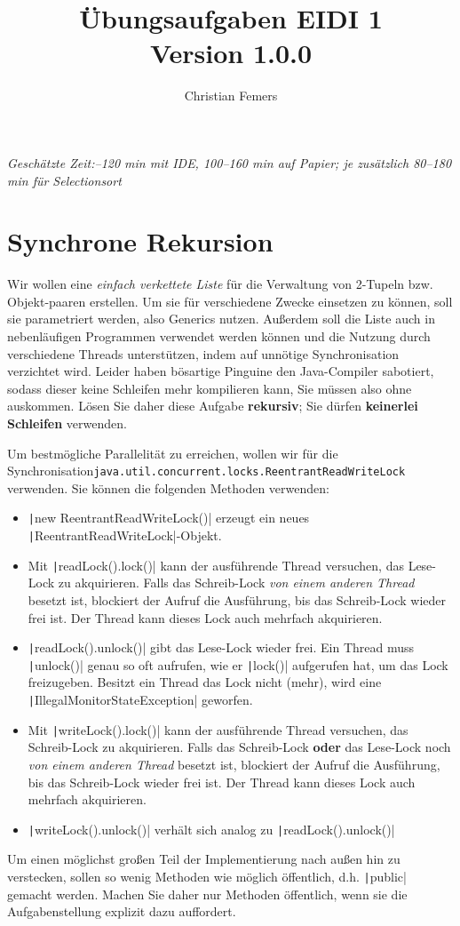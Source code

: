 \documentclass[11pt]{article} %
\title{Übungsaufgaben EIDI 1 \\ \small \color{magenta}Version 1.0.0}
\author{Christian Femers}
\newcommand{\code}[1]{\texttt|#1|}
\begin{document}
\maketitle
\emph{Geschätzte Zeit:–120 min mit IDE, 100–160 min auf Papier; je zusätzlich 80–180 min für Selectionsort}
\section{Synchrone Rekursion}
Wir wollen eine \emph{einfach verkettete Liste} für die Verwaltung von 2-Tupeln bzw. Objekt-paaren erstellen. Um sie für verschiedene Zwecke einsetzen zu können, soll sie parametriert werden, also Generics nutzen. Außerdem soll die Liste auch in nebenläufigen Programmen verwendet werden können und die Nutzung durch verschiedene Threads unterstützen, indem auf unnötige Synchronisation verzichtet wird. Leider haben bösartige Pinguine den Java-Compiler sabotiert, sodass dieser keine Schleifen mehr kompilieren kann, Sie müssen also ohne auskommen. Lösen Sie daher diese Aufgabe \textbf{rekursiv}; Sie dürfen \textbf{keinerlei Schleifen} verwenden.\par
Um bestmögliche Parallelität zu erreichen, wollen wir für die Synchronisation\newline \texttt{java.util.concurrent.locks.ReentrantReadWriteLock} verwenden. Sie können die folgenden Methoden verwenden:
\begin{itemize}
\item \code{new ReentrantReadWriteLock()} erzeugt ein neues \code{ReentrantReadWriteLock}-Objekt.
\item Mit \code{readLock().lock()} kann der ausführende Thread versuchen, das Lese-Lock zu akquirieren. Falls das Schreib-Lock \emph{von einem anderen Thread} besetzt ist, blockiert der Aufruf die Ausführung, bis das Schreib-Lock wieder frei ist. Der Thread kann dieses Lock auch mehrfach akquirieren.
\item \code{readLock().unlock()} gibt das Lese-Lock wieder frei. Ein Thread muss \code{unlock()} genau so oft aufrufen, wie er \code{lock()} aufgerufen hat, um das Lock freizugeben. Besitzt ein Thread das Lock nicht (mehr), wird eine \code{IllegalMonitorStateException} geworfen.
\item Mit \code{writeLock().lock()} kann der ausführende Thread versuchen, das Schreib-Lock zu akquirieren. Falls das Schreib-Lock \textbf{oder} das Lese-Lock noch \emph{von einem anderen Thread} besetzt ist, blockiert der Aufruf die Ausführung, bis das Schreib-Lock wieder frei ist. Der Thread kann dieses Lock auch mehrfach akquirieren.
\item \code{writeLock().unlock()} verhält sich analog zu \code{readLock().unlock()}
\end{itemize}
Um einen möglichst großen Teil der Implementierung nach außen hin zu verstecken, sollen so wenig Methoden wie möglich öffentlich, d.h. \code{public} gemacht werden. Machen Sie daher nur Methoden öffentlich, wenn sie die Aufgabenstellung explizit dazu auffordert.
\end{document}
